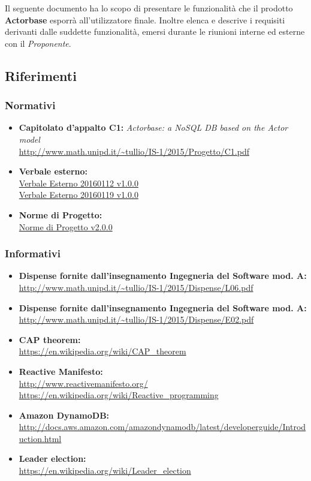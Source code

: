 \documentclass{scalatekids-article}
\begin{document}
Il seguente documento ha lo scopo di presentare le funzionalità che il prodotto
\textbf{Actorbase} esporrà all'utilizzatore finale. Inoltre elenca e descrive i
requisiti derivanti dalle suddette funzionalità, emersi durante le riunioni
interne ed esterne con il \textit{Proponente}.
\prodPurpose{}\glossExpl{}

\subsection{Riferimenti}

\subsubsection{Normativi}

\begin{itemize}
\item\textbf{Capitolato d'appalto C1:} \textit{Actorbase: a NoSQL DB based on the Actor model}\\
  \url{http://www.math.unipd.it/~tullio/IS-1/2015/Progetto/C1.pdf}
\item\textbf{Verbale esterno:}\\
  \href{run:../RR/Interni/VerbaleEsterno20160112\_v1.0.0.pdf}{Verbale Esterno 20160112 v1.0.0}\\
  \href{run:../RR/Interni/VerbaleEsterno20160119\_v1.0.0.pdf}{Verbale Esterno 20160119 v1.0.0}
\item\textbf{Norme di Progetto:}\\
  \href{run:../Interni/NormeDiProgetto\_v2.0.0.pdf}{Norme di Progetto v2.0.0}
\end{itemize}

\subsubsection{Informativi}

\begin{itemize}
\item\textbf{Dispense fornite dall'insegnamento Ingegneria del Software mod. A:}\\
  \url{http://www.math.unipd.it/~tullio/IS-1/2015/Dispense/L06.pdf}
\item\textbf{Dispense fornite dall'insegnamento Ingegneria del Software mod. A:}\\
  \url{http://www.math.unipd.it/~tullio/IS-1/2015/Dispense/E02.pdf}
\item\textbf{CAP theorem:}\\
  \url{https://en.wikipedia.org/wiki/CAP_theorem}
\item\textbf{Reactive Manifesto:}\\
  \url{http://www.reactivemanifesto.org/}\\
  \url{https://en.wikipedia.org/wiki/Reactive_programming}
\item\textbf{Amazon DynamoDB:}\\
  \url{http://docs.aws.amazon.com/amazondynamodb/latest/developerguide/Introduction.html}
\item\textbf{Leader election:}\\
  \url{https://en.wikipedia.org/wiki/Leader_election}
\end{itemize}
\end{document}
